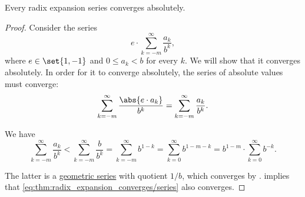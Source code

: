 \begin{proposition}\label{thm:radix_expansion_converges}
  Every radix expansion series converges absolutely.
\end{proposition}
\begin{proof}
  Consider the series
  \begin{equation}\label{eq:thm:radix_expansion_converges/general}
    e \cdot \sum_{k=-m}^\infty \frac {a_k} {b^k},
  \end{equation}
  where \( e \in \set{ 1, -1 } \) and \( 0 \leq a_k < b \) for every \( k \). We will show that it converges absolutely. In order for it to converge absolutely, the series of absolute values must converge:
  \begin{equation}\label{eq:thm:radix_expansion_converges/absolute}
    \sum_{k=-m}^\infty \frac {\abs{e \cdot a_k}} {b^k} = \sum_{k=-m}^\infty \frac {a_k} {b^k}.
  \end{equation}

  We have
  \begin{equation*}
    \sum_{k=-m}^\infty \frac {a_k} {b^k}
    <
    \sum_{k=-m}^\infty \frac b {b^k}
    =
    \sum_{k=-m}^\infty b^{1-k}
    =
    \sum_{k=0}^\infty b^{1-m-k}
    =
    b^{1-m} \cdot \sum_{k=0}^\infty b^{-k}.
  \end{equation*}

  The latter is a \hyperref[eq:def:geometric_series]{geometric series} with quotient \( 1 / b \), which converges by .  implies that \eqref{eq:thm:radix_expansion_converges/series} also converges.
\end{proof}

